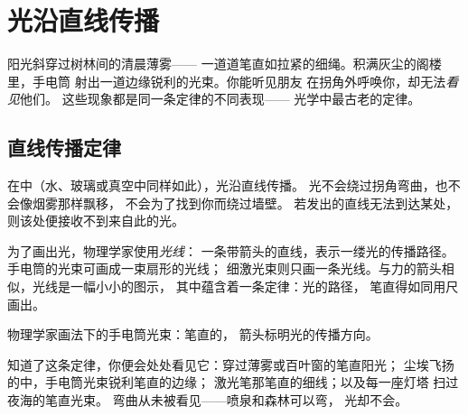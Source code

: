 \chapter{光沿直线传播}\label{ch:g4:light-straight-lines}

阳光斜穿过树林间的清晨薄雾——
一道道笔直如拉紧的细绳。积满灰尘的阁楼里，手电筒
射出一道边缘锐利的光束。你能听见朋友
在拐角外呼唤你，却无法\emph{看见}他们。
这些现象都是同一条定律的不同表现——
光学中最古老的定律。

\section{直线传播定律}

\begin{proposition}[光沿直线传播]\label{prop:g4:light-straight-lines:law}
在中（水、玻璃或真空中同样如此），光沿直线传播。
光不会绕过拐角弯曲，也不会像烟雾那样飘移，
不会为了找到你而绕过墙壁。
若发出的直线无法到达某处，
则该处便接收不到来自此的光。
\end{proposition}

\begin{definition}[光线]\label{def:g4:light-straight-lines:ray}
为了画出光，物理学家使用\emph{光线}：
一条带箭头的直线，表示一缕光的传播路径。
手电筒的光束可画成一束扇形的光线；
细激光束则只画一条光线。与力的箭头相似，光线是一幅小小的图示，
其中蕴含着一条定律：光的路径，
笔直得如同用尺画出。
\end{definition}

\begin{omfigure}

{\small 物理学家画法下的手电筒光束：笔直的，
箭头标明光的传播方向。}
\end{omfigure}

\begin{example}[定律的表现]\label{ex:g4:light-straight-lines:sightings}
知道了这条定律，你便会处处看见它：穿过薄雾或百叶窗的笔直阳光；
尘埃飞扬的中，手电筒光束锐利笔直的边缘；
激光笔那笔直的细线；以及每一座灯塔
扫过夜海的笔直光束。
弯曲从未被看见——喷泉和森林可以弯，
光却不会。
\end{example}

